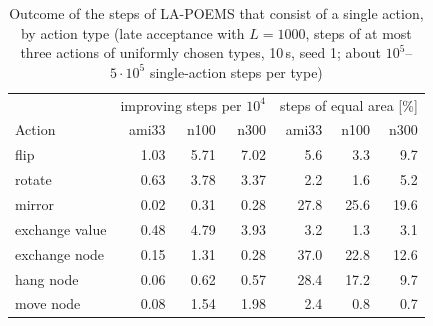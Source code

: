 \begin{table}
\centering
\small
\begin{tabular}{@{}lrrrrrr@{}}
\toprule
 & \multicolumn{3}{c}{improving steps per $10^4$} & \multicolumn{3}{c}{steps of equal area [\%]} \\
Action & ami33 & n100 & n300 & ami33 & n100 & n300 \\
\midrule
flip & 1.03 & 5.71 & 7.02 & 5.6 & 3.3 & 9.7 \\
rotate & 0.63 & 3.78 & 3.37 & 2.2 & 1.6 & 5.2 \\
mirror & 0.02 & 0.31 & 0.28 & 27.8 & 25.6 & 19.6 \\
exchange value & 0.48 & 4.79 & 3.93 & 3.2 & 1.3 & 3.1 \\
exchange node & 0.15 & 1.31 & 0.28 & 37.0 & 22.8 & 12.6 \\
hang node & 0.06 & 0.62 & 0.57 & 28.4 & 17.2 & 9.7 \\
move node & 0.08 & 1.54 & 1.98 & 2.4 & 0.8 & 0.7 \\
\bottomrule
\end{tabular}
\caption{Outcome of the steps of LA-POEMS that consist of a single action, by action type (late acceptance with $L = 1000$, steps of at most three actions of uniformly chosen types, 10\,s, seed 1; about $10^5$--$5 \cdot 10^5$ single-action steps per type)}
\label{tab:actionstats}
\end{table}
